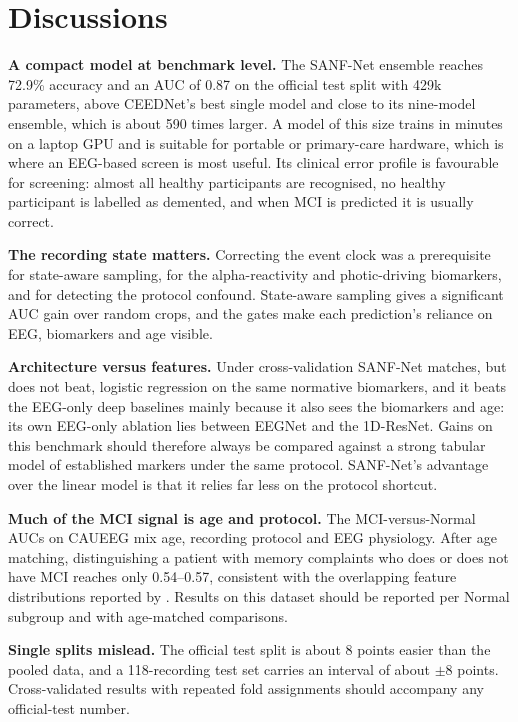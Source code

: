 \section{Discussions}

\textbf{A compact model at benchmark level.} The SANF-Net ensemble reaches 72.9\% accuracy and an AUC of 0.87 on
the official test split with 429k parameters, above CEEDNet's best single model and close to its nine-model
ensemble, which is about 590 times larger. A model of this size trains in minutes on a laptop GPU and is
suitable for portable or primary-care hardware, which is where an EEG-based screen is most useful. Its
clinical error profile is favourable for screening: almost all healthy participants are recognised, no healthy
participant is labelled as demented, and when MCI is predicted it is usually correct.

\textbf{The recording state matters.} Correcting the event clock was a prerequisite for state-aware sampling,
for the alpha-reactivity and photic-driving biomarkers, and for detecting the protocol confound. State-aware
sampling gives a significant AUC gain over random crops, and the gates make each prediction's reliance on EEG,
biomarkers and age visible.

\textbf{Architecture versus features.} Under cross-validation SANF-Net matches, but does not beat, logistic
regression on the same normative biomarkers, and it beats the EEG-only deep baselines mainly because it also
sees the biomarkers and age: its own EEG-only ablation lies between EEGNet and the 1D-ResNet. Gains on this
benchmark should therefore always be compared against a strong tabular model of established markers under the
same protocol. SANF-Net's advantage over the linear model is that it relies far less on the protocol shortcut.

\textbf{Much of the MCI signal is age and protocol.} The MCI-versus-Normal AUCs on CAUEEG mix age, recording
protocol and EEG physiology. After age matching, distinguishing a patient with memory complaints who does or
does not have MCI reaches only 0.54--0.57, consistent with the overlapping feature distributions reported by
\citet{geneeg2025}. Results on this dataset should be reported per Normal subgroup and with age-matched
comparisons.

\textbf{Single splits mislead.} The official test split is about 8 points easier than the pooled data, and a
118-recording test set carries an interval of about $\pm8$ points. Cross-validated results with repeated fold
assignments should accompany any official-test number.

